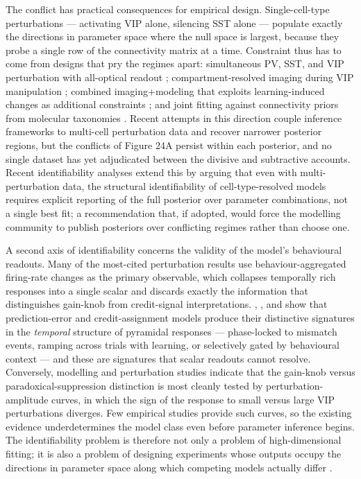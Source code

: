 \documentclass[11pt]{article}
\begin{document}
The conflict has practical consequences for empirical design. Single-cell-type perturbations --- activating VIP alone, silencing SST alone --- populate exactly the directions in parameter space where the null space is largest, because they probe a single row of the connectivity matrix at a time. Constraint thus has to come from designs that pry the regimes apart: simultaneous PV, SST, and VIP perturbation with all-optical readout \citep{Veit2023, Lenkey2025}; compartment-resolved imaging during VIP manipulation \citep{Bilash2023, Pakan2016, Anastasiades2021a}; combined imaging+modeling that exploits learning-induced changes as additional constraints \citep{Poort2022, Lee2025}; and joint fitting against connectivity priors from molecular taxonomies \citep{Yao2023, Rudy2011}. Recent attempts in this direction \citep{Moreni2025a, Jiang2024b, Terwal2021, Huang2025a, Chou2021} couple inference frameworks to multi-cell perturbation data and recover narrower posterior regions, but the conflicts of Figure 24A persist within each posterior, and no single dataset has yet adjudicated between the \citep{Hertag2019} divisive and \citep{Tahvili2025b} subtractive accounts. Recent identifiability analyses extend this by arguing that even with multi-perturbation data, the structural identifiability of cell-type-resolved models requires explicit reporting of the full posterior \citep{Rademacher2025} over parameter combinations, not a single best fit; a recommendation that, if adopted, would force the modelling community to publish posteriors over conflicting regimes rather than choose one.

A second axis of identifiability concerns the validity of the model's behavioural readouts. Many of the most-cited perturbation results \citep{Pi2013, Fu2014, Lee2013, Krabbe2019, Myersjoseph2024} use behaviour-aggregated firing-rate changes as the primary observable, which collapses temporally rich responses into a single scalar and discards exactly the information that distinguishes gain-knob from credit-signal interpretations. \citet{Hertag2020}, \citet{Hertag2021}, and \citet{Wilmes2019} show that prediction-error and credit-assignment models produce their distinctive signatures in the \textit{temporal} structure of pyramidal responses --- phase-locked to mismatch events, ramping across trials with learning, or selectively gated by behavioural context --- and these are signatures that scalar readouts cannot resolve. Conversely, modelling and perturbation studies indicate that the gain-knob versus paradoxical-suppression distinction is most cleanly tested by perturbation-amplitude curves, in which the sign of the response to small versus large VIP perturbations diverges. Few empirical studies provide such curves, so the existing evidence underdetermines the model class even before parameter inference begins. The identifiability problem is therefore not only a problem of high-dimensional fitting; it is also a problem of designing experiments whose outputs occupy the directions in parameter space along which competing models actually differ \citep{Veit2023, Lenkey2025, Dellal2025, Reimann2026}.
\end{document}
